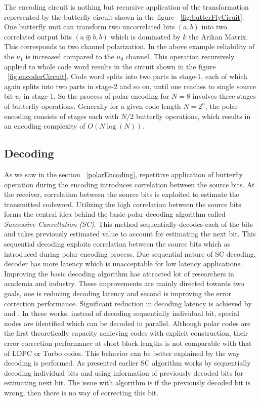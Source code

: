 The encoding circuit is nothing but recursive application of the transformation represented by the butterfly circuit shown in the figure ~\ref{fig:butterFlyCicuit}. One butterfly unit can transform two uncorrelated bits $(a,b)$ into two correlated output bits $(a\oplus b,b)$ which is dominated by $k$ the Arikan Matrix. This corresponds to two channel polarization. In the above example reliability of the $u_{1}$ is increased compared to the $u_{0}$ channel. This operation recursively applied to whole code word results in the circuit shown in the figure ~\ref{fig:encoderCircuit}. Code word splits into two parts in stage-1, each of which again splits into two parts in stage-2 and so on, until one reaches to single source bit $u_{i}$ in stage-1. So the process of polar encoding for $N = 8$ involves three stages of butterfly operations. Generally for a given code length $N=2^{n}$, the polar encoding consists of stages each with $N/2$ butterfly operations, which results in an encoding complexity of $O(N\log(N))$.



\subsection{Decoding}
As we saw in the section ~\ref{polarEncoding}, repetitive application of butterfly operation during the encoding introduces correlation between the source bits. At the receiver, correlation between the source bits is exploited to estimate the transmitted codeword. Utilizing the high correlation between the source bits forms the central idea behind the basic polar decoding algorithm called \emph{Successive Cancellation (SC)}. This method sequentially decodes each of the bits and takes previously estimated value to account for estimating the next bit. This sequential decoding exploits correlation between the source bits which as introduced during polar encoding process. Due sequential nature of SC decoding, decoder has more latency which is unacceptable for low latency applications. Improving the basic decoding algorithm has attracted lot of researchers in academia and industry. These improvements are mainly directed towards two goals, one is reducing decoding latency and second is improving the error correction performance. Significant reduction in decoding latency is achieved by \cite{SSC} and \cite{fastSSC}. In these works, instead of decoding sequentially individual bit, special nodes are identified which can be decoded in parallel. Although polar codes are the first theoretically capacity achieving codes with explicit construction, their error correction performance at short block lengths is not comparable with that of LDPC or Turbo codes. This behavior can be better explained by the way decoding is performed. As presented earlier SC algorithm works by sequentially decoding individual bits and using information of previously decoded bits for estimating next bit. The issue with algorithm is if the previously decoded bit is wrong, then there is no way of correcting this bit.

